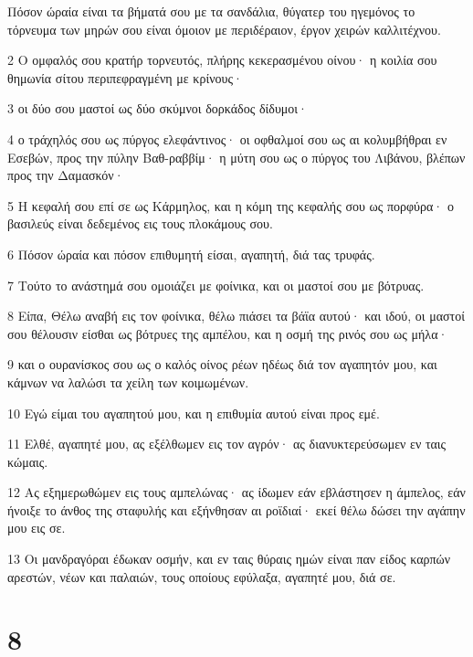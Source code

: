 \par Πόσον ώραία είναι τα βήματά σου με τα σανδάλια, θύγατερ του ηγεμόνος το τόρνευμα των μηρών σου είναι όμοιον με περιδέραιον, έργον χειρών καλλιτέχνου.
\par 2 Ο ομφαλός σου κρατήρ τορνευτός, πλήρης κεκερασμένου οίνου· η κοιλία σου θημωνία σίτου περιπεφραγμένη με κρίνους·
\par 3 οι δύο σου μαστοί ως δύο σκύμνοι δορκάδος δίδυμοι·
\par 4 ο τράχηλός σου ως πύργος ελεφάντινος· οι οφθαλμοί σου ως αι κολυμβήθραι εν Εσεβών, προς την πύλην Βαθ-ραββίμ· η μύτη σου ως ο πύργος του Λιβάνου, βλέπων προς την Δαμασκόν·
\par 5 Η κεφαλή σου επί σε ως Κάρμηλος, και η κόμη της κεφαλής σου ως πορφύρα· ο βασιλεύς είναι δεδεμένος εις τους πλοκάμους σου.
\par 6 Πόσον ώραία και πόσον επιθυμητή είσαι, αγαπητή, διά τας τρυφάς.
\par 7 Τούτο το ανάστημά σου ομοιάζει με φοίνικα, και οι μαστοί σου με βότρυας.
\par 8 Είπα, Θέλω αναβή εις τον φοίνικα, θέλω πιάσει τα βάϊα αυτού· και ιδού, οι μαστοί σου θέλουσιν είσθαι ως βότρυες της αμπέλου, και η οσμή της ρινός σου ως μήλα·
\par 9 και ο ουρανίσκος σου ως ο καλός οίνος ρέων ηδέως διά τον αγαπητόν μου, και κάμνων να λαλώσι τα χείλη των κοιμωμένων.
\par 10 Εγώ είμαι του αγαπητού μου, και η επιθυμία αυτού είναι προς εμέ.
\par 11 Ελθέ, αγαπητέ μου, ας εξέλθωμεν εις τον αγρόν· ας διανυκτερεύσωμεν εν ταις κώμαις.
\par 12 Ας εξημερωθώμεν εις τους αμπελώνας· ας ίδωμεν εάν εβλάστησεν η άμπελος, εάν ήνοιξε το άνθος της σταφυλής και εξήνθησαν αι ροϊδιαί· εκεί θέλω δώσει την αγάπην μου εις σε.
\par 13 Οι μανδραγόραι έδωκαν οσμήν, και εν ταις θύραις ημών είναι παν είδος καρπών αρεστών, νέων και παλαιών, τους οποίους εφύλαξα, αγαπητέ μου, διά σε.

\chapter{8}

